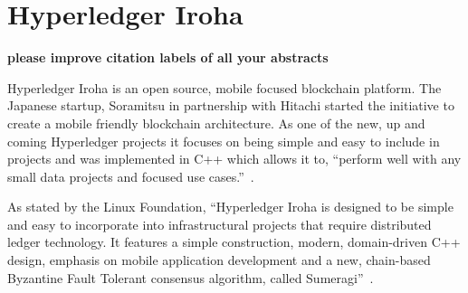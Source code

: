 \section{Hyperledger Iroha}

{\bf please improve citation labels of all your abstracts}

Hyperledger Iroha is an open source, mobile focused blockchain
platform.  The Japanese startup, Soramitsu in partnership with Hitachi
started the initiative to create a mobile friendly blockchain
architecture. As one of the new, up and coming Hyperledger projects it
focuses on being simple and easy to include in projects and was
implemented in C++ which allows it to, ``perform well with any small
data projects and focused use cases.''~\cite{Behlendorf}.

As stated by the Linux Foundation, ``Hyperledger Iroha is designed to
be simple and easy to incorporate into infrastructural projects that
require distributed ledger technology. It features a simple
construction, modern, domain-driven C++ design, emphasis on mobile
application development and a new, chain-based Byzantine Fault
Tolerant consensus algorithm, called 
Sumeragi''~\cite{Active Status Iroha}.
